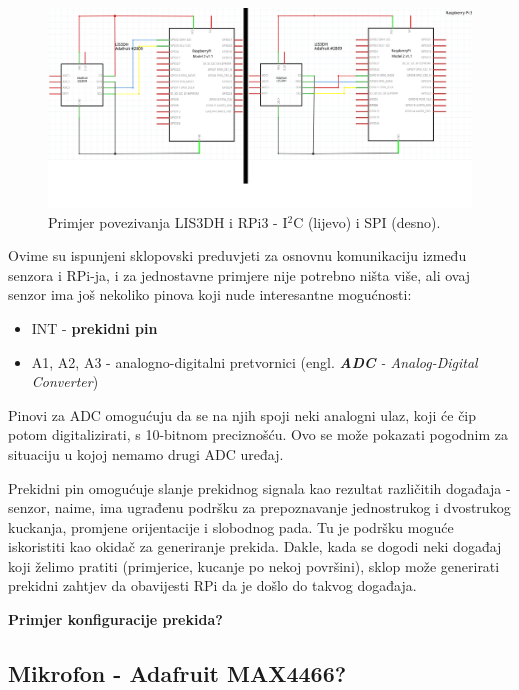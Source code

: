 \documentclass[12pt,a4paper]{article}
\begin{document}
		\begin{figure}[h!]
			\includegraphics[width=\linewidth]{slike/i2cSpiMergeNoLabel.png}
			\caption{Primjer povezivanja LIS3DH i RPi3 - I$^2$C (lijevo) i SPI (desno).}
			\label{fig:lis3dhRpi}
		\end{figure}

		\par Ovime su ispunjeni sklopovski preduvjeti za osnovnu komunikaciju između senzora i RPi-ja, i za jednostavne primjere nije potrebno ništa više, ali ovaj senzor ima još nekoliko pinova koji nude interesantne mogućnosti:
		\begin{itemize}
			\item INT - \textbf{prekidni pin}
			\item A1, A2, A3 - analogno-digitalni pretvornici (engl. \textit{\textbf{ADC} - Analog-Digital Converter}) \\
		\end{itemize}

		Pinovi za ADC omogućuju da se na njih spoji neki analogni ulaz, koji će čip potom digitalizirati, s 10-bitnom preciznošću. Ovo se može pokazati pogodnim za situaciju u kojoj nemamo drugi ADC uređaj. 

		\par Prekidni pin omogućuje slanje prekidnog signala kao rezultat različitih događaja - senzor, naime, ima ugrađenu podršku za prepoznavanje jednostrukog i dvostrukog kuckanja, promjene orijentacije i slobodnog pada. Tu je podršku moguće iskoristiti kao okidač za generiranje prekida. Dakle, kada se dogodi neki događaj koji želimo pratiti (primjerice, kucanje po nekoj površini), sklop može generirati prekidni zahtjev da obavijesti RPi da je došlo do takvog događaja.

		\par \textbf{Primjer konfiguracije prekida?}


	\newpage
	\subsection{Mikrofon - Adafruit MAX4466?}
\newpage
\end{document}
